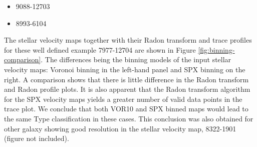 \begin{itemize}
    \item 9088-12703
    \item 8993-6104
\end{itemize}

The stellar velocity maps together with their Radon transform and trace profiles for these well defined example 7977-12704 are shown in Figure \ref{fig:binning-comparison}. The differences being the binning models of the input stellar velocity maps: Voronoi binning in the left-hand panel and SPX binning on the right. A comparison shows that there is little difference in the Radon transform and Radon profile plots. It is also apparent that the Radon transform algorithm for the SPX velocity maps yields a greater number of valid data points in the trace plot. We conclude that both VOR10 and SPX binned maps would lead to the same Type classification in these cases. This conclusion was also obtained for other galaxy showing good resolution in the stellar velocity map,  8322-1901 (figure not included). 

